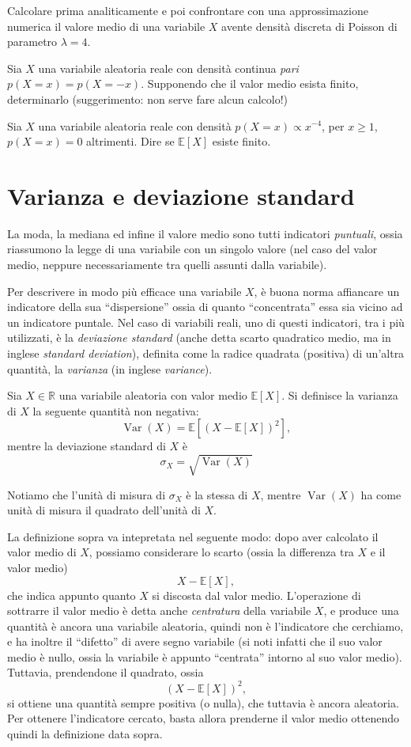 \documentclass[
  italian,
  letterpaper,
]{book}
\newcommand{\bra}[1]{\left( #1 \right)}
\newcommand{\sqa}[1]{\left[ #1 \right]}
\newcommand{\R}{\mathbb{R}}
\newcommand{\E}[1]{\mathbb{E}\sqa{#1}}
\newcommand{\Var}[1]{\operatorname{Var}\bra{#1}}
\theoremstyle{definition}
\theoremstyle{remark}
\begin{document}
Calcolare prima analiticamente e poi confrontare con una approssimazione
numerica il valore medio di una variabile \(X\) avente densità discreta
di Poisson di parametro \(\lambda = 4\).

Sia \(X\) una variabile aleatoria reale con densità continua \emph{pari}
\(p(X=x) = p(X=-x)\). Supponendo che il valor medio esista finito,
determinarlo (suggerimento: non serve fare alcun calcolo!)

Sia \(X\) una variabile aleatoria reale con densità
\(p(X=x) \propto x^{-4}\), per \(x \ge 1\), \(p(X=x)=0\) altrimenti.
Dire se \(\E{X}\) esiste finito.

\section{Varianza e deviazione standard}\label{sec-varianza}

La moda, la mediana ed infine il valore medio sono tutti indicatori
\emph{puntuali}, ossia riassumono la legge di una variabile con un
singolo valore (nel caso del valor medio, neppure necessariamente tra
quelli assunti dalla variabile).

Per descrivere in modo più efficace una variabile \(X\), è buona norma
affiancare un indicatore della sua ``dispersione'' ossia di quanto
``concentrata'' essa sia vicino ad un indicatore puntale. Nel caso di
variabili reali, uno di questi indicatori, tra i più utilizzati, è la
\emph{deviazione standard} (anche detta scarto quadratico medio, ma in
inglese \emph{standard deviation}), definita come la radice quadrata
(positiva) di un'altra quantità, la \emph{varianza} (in inglese
\emph{variance}).

Sia \(X \in \R\) una variabile aleatoria con valor medio \(\E{X}\). Si
definisce la varianza di \(X\) la seguente quantità non negativa:
\[ \Var{X} = \E{ (X- \E{X})^2 },\] mentre la deviazione standard di
\(X\) è \[ \sigma_X = \sqrt{ \Var{X}}\]

Notiamo che l'unità di misura di \(\sigma_X\) è la stessa di \(X\),
mentre \(\Var{X}\) ha come unità di misura il quadrato dell'unità di
\(X\).

La definizione sopra va intepretata nel seguente modo: dopo aver
calcolato il valor medio di \(X\), possiamo considerare lo scarto (ossia
la differenza tra \(X\) e il valor medio) \[ X - \E{X},\] che indica
appunto quanto \(X\) si discosta dal valor medio. L'operazione di
sottrarre il valor medio è detta anche \emph{centratura} della variabile
\(X\), e produce una quantità è ancora una variabile aleatoria, quindi
non è l'indicatore che cerchiamo, e ha inoltre il ``difetto'' di avere
segno variabile (si noti infatti che il suo valor medio è nullo, ossia
la variabile è appunto ``centrata'' intorno al suo valor medio).
Tuttavia, prendendone il quadrato, ossia \[ (X- \E{X})^2, \] si ottiene
una quantità sempre positiva (o nulla), che tuttavia è ancora aleatoria.
Per ottenere l'indicatore cercato, basta allora prenderne il valor medio
ottenendo quindi la definizione data sopra.
\end{document}
